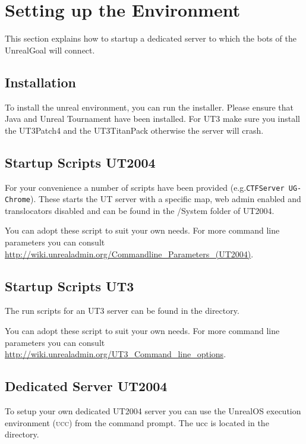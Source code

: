 \documentclass[11pt,a4paper]{article}
\begin{document}
%
%
%
\section{Setting up the Environment}\label{sec:setup}

This section explains how to startup a dedicated server to which the bots of the UnrealGoal  will connect. 

\subsection{Installation}

To install the unreal environment, you can run the installer.  Please ensure that Java and Unreal Tournament have been installed. For UT3 make sure you install the UT3Patch4 and the UT3TitanPack otherwise the server will crash.

\subsection{Startup Scripts UT2004}

For your convenience a number of scripts have been provided (e.g.\verb|CTFServer UG-Chrome|). These starts the UT server with a specific map, web admin enabled and translocators disabled and can be found in the /System folder of UT2004.

You can adopt these script to suit your own needs. For more command line parameters you can consult \url{http://wiki.unrealadmin.org/Commandline_Parameters_(UT2004)}.

\subsection{Startup Scripts UT3}

The run scripts for an UT3 server can be found in the  directory.

You can adopt these script to suit your own needs. For more command line parameters you can consult \url{http://wiki.unrealadmin.org/UT3_Command_line_options}.

\subsection{Dedicated Server UT2004}

To setup your own dedicated UT2004 server you can use the UnrealOS execution environment (\textsc{ucc}) from the command prompt. The ucc is located in the  directory. 
\end{document}
